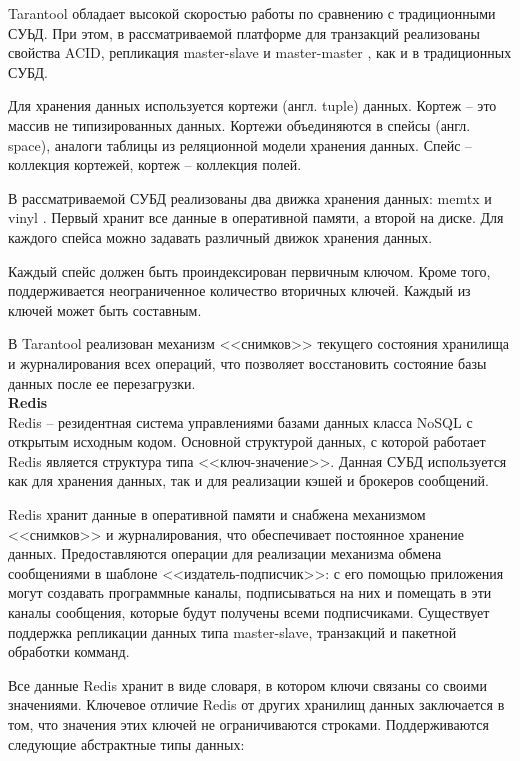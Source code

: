Tarantool обладает высокой скоростью работы по сравнению с традиционными СУЬД.  При этом, в рассматриваемой платформе для транзакций реализованы свойства ACID, репликация master-slave \cite{master-slave} и master-master \cite{master-master}, как и в традиционных СУБД.

Для хранения данных используется кортежи (англ. tuple) данных. Кортеж -- это массив не типизированных данных. Кортежи объединяются в спейсы (англ. space), аналоги таблицы из реляционной модели хранения данных. Спейс -- коллекция кортежей, кортеж -- коллекция полей.

В рассматриваемой СУБД реализованы два движка хранения данных: memtx \cite{memtx-vinyl} и vinyl \cite{memtx-vinyl}. Первый хранит все данные в оперативной памяти, а второй на диске. Для каждого спейса можно задавать различный движок хранения данных. 

Каждый спейс должен быть проиндексирован первичным ключом. Кроме того, поддерживается неограниченное количество вторичных ключей. Каждый из ключей может быть составным.

В Tarantool реализован механизм <<снимков>> текущего состояния хранилища и журналирования всех операций, что позволяет восстановить состояние базы данных после ее перезагрузки.\\

\noindent\textbf{Redis}\\

Redis \cite{redis} -- резидентная система управлениями базами данных класса NoSQL с открытым исходным кодом. Основной структурой данных, с которой работает Redis является структура типа <<ключ-значение>>. Данная СУБД используется как для хранения данных, так и для реализации кэшей и брокеров сообщений.

Redis хранит данные в оперативной памяти и снабжена механизмом <<снимков>> и журналирования, что обеспечивает постоянное хранение данных. Предоставляются операции для реализации механизма обмена сообщениями в шаблоне <<издатель-подписчик>>: с его помощью приложения могут создавать программные каналы, подписываться на них и помещать в эти каналы сообщения, которые будут получены всеми подписчиками. Существует поддержка репликации данных типа master-slave, транзакций и пакетной обработки комманд.

Все данные Redis хранит в виде словаря, в котором ключи связаны со своими значениями. Ключевое отличие Redis от других хранилищ данных заключается в том, что значения этих ключей не ограничиваются строками. Поддерживаются следующие абстрактные типы данных:

